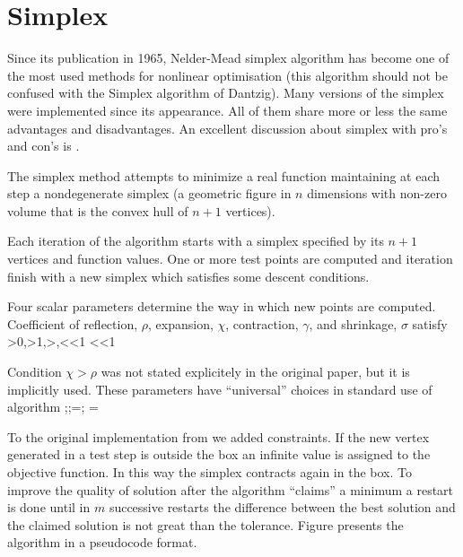\section{Simplex}
\par{Since its publication in 1965, Nelder-Mead simplex algorithm \citep{Nelder65}
has become one of the most used methods for nonlinear optimisation (this
algorithm should not be confused with the Simplex algorithm of Dantzig). Many
versions of the simplex were implemented since its appearance. All of them
share more or less the same advantages and disadvantages. An excellent
discussion about simplex with pro's and con's is \citep{Lagarias98}.}
\par{The simplex method attempts to minimize a real function maintaining at each
step a nondegenerate simplex (a geometric figure in $n$ dimensions with non-zero
volume that is the convex hull of $n+1$ vertices).}
\par{Each iteration of the algorithm starts with a simplex specified by its $n+1$
vertices and function values. One or more test points are computed and
iteration finish with a new simplex which satisfies some descent conditions.}
\par{Four scalar parameters determine the way in which new points are
computed. Coefficient of reflection, $\rho$, expansion, $\chi$, contraction,
$\gamma$, and shrinkage, $\sigma$ satisfy}
\be
\rho>0,\quad \chi>1,\quad \chi>\rho,<\gamma<1 \quad {}<\sigma<1
\ee
\par{Condition $\chi>\rho$ was not stated explicitely in the original paper, but it
is implicitly used. These parameters have ``universal'' choices in standard use
of algorithm}
\be
{};\quad {};\quad \gamma=; \quad {}\quad \sigma=
\ee
\par{To the original implementation from \citep{Press07} we added constraints. If the new
vertex generated in a test step is outside the box an infinite value is
assigned to the objective function. In this way the simplex contracts again in
the box. To improve the quality of solution after the algorithm ``claims'' a
minimum a restart is done until in $m$ successive restarts the difference
between the best solution and the claimed solution is not great than the
tolerance. Figure  presents the algorithm in a pseudocode
format.}
